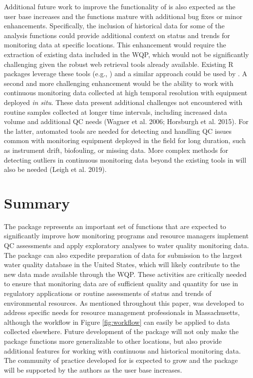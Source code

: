 Additional future work to improve the functionality of  is also expected as the user base increases and the functions mature with additional bug fixes or minor enhancements. Specifically, the inclusion of historical data for some of the analysis functions could provide additional context on status and trends for monitoring data at specific locations. This enhancement would require the extraction of existing data included in the WQP, which would not be significantly challenging given the robust web retrieval tools already available. Existing R packages leverage these tools (e.g., ) and a similar approach could be used by . A second and more challenging enhancement would be the ability to work with continuous monitoring data collected at high temporal resolution with equipment deployed \emph{in situ}. These data present additional challenges not encountered with routine samples collected at longer time intervals, including increased data volume and additional QC needs (Wagner et al. 2006; Horsburgh et al. 2015). For the latter, automated tools are needed for detecting and handling QC issues common with monitoring equipment deployed in the field for long duration, such as instrument drift, biofouling, or missing data. More complex methods for detecting outliers in continuous monitoring data beyond the existing tools in  will also be needed (Leigh et al. 2019).

\hypertarget{summary}{%
\section{Summary}\label{summary}}

The  package represents an important set of functions that are expected to significantly improve how monitoring programs and resource managers implement QC assessments and apply exploratory analyses to water quality monitoring data. The package can also expedite preparation of data for submission to the largest water quality database in the United States, which will likely contribute to the new data made available through the WQP. These activities are critically needed to ensure that monitoring data are of sufficient quality and quantity for use in regulatory applications or routine assessments of status and trends of environmental resources. As mentioned throughout this paper,  was developed to address specific needs for resource management professionals in Massachusetts, although the workflow in Figure \ref{fig:workflow} can easily be applied to data collected elsewhere. Future development of the package will not only make the package functions more generalizable to other locations, but also provide additional features for working with continuous and historical monitoring data. The community of practice developed for  is expected to grow and the package will be supported by the authors as the user base increases.

